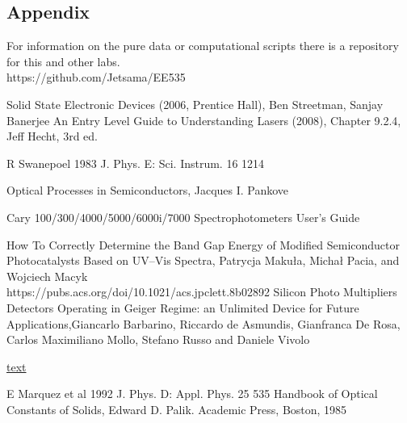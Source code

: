 \documentclass[10pt,a4paper]{article}
\begin{document}
\begin{multicols}{2}
\section*{Appendix}
For information on the pure data or computational scripts there is a repository for this and other labs. \\
https://github.com/Jetsama/EE535\\
\begin{thebibliography}{9}
 Solid State Electronic Devices (2006, Prentice Hall), Ben Streetman, Sanjay Banerjee
An Entry Level Guide to Understanding Lasers (2008), Chapter 9.2.4, Jeff Hecht, 3rd ed. 

R Swanepoel 1983 J. Phys. E: Sci. Instrum. 16 1214

Optical Processes in Semiconductors, Jacques I. Pankove

Cary 100/300/4000/5000/6000i/7000 Spectrophotometers User's Guide

How To Correctly Determine the Band Gap Energy of Modified Semiconductor Photocatalysts Based on UV–Vis Spectra, Patrycja Makuła, Michał Pacia, and Wojciech Macyk\\https://pubs.acs.org/doi/10.1021/acs.jpclett.8b02892
Silicon Photo Multipliers Detectors Operating in Geiger Regime: an Unlimited Device for Future Applications,Giancarlo Barbarino, Riccardo de Asmundis, Gianfranca De Rosa, Carlos Maximiliano Mollo, Stefano Russo and Daniele Vivolo


 \href{https://erdogant.github.io/findpeaks/pages/html/Examples.html#find-peaks-in-low-sampled-dataset}{text}


 E Marquez et al 1992 J. Phys. D: Appl. Phys. 25 535
Handbook of Optical Constants of Solids, Edward D. Palik. Academic Press, Boston, 1985 
\end{thebibliography}


\end{multicols}
\end{document}
